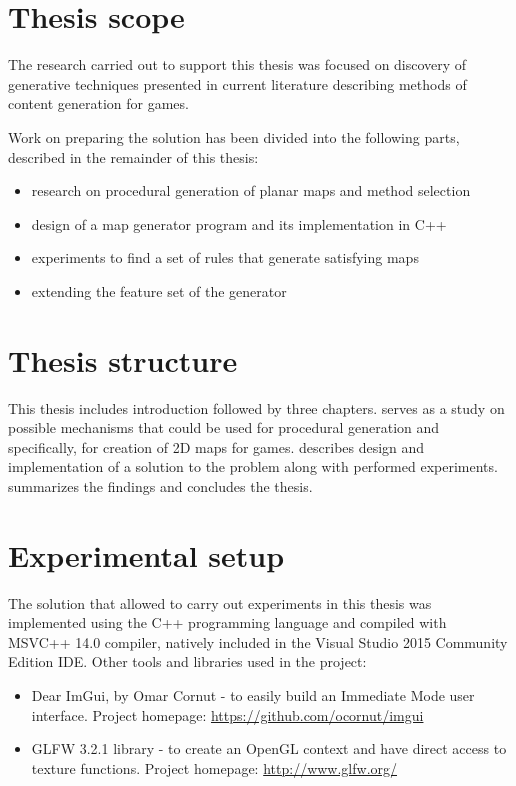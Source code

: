 \documentclass[12pt]{report}
\begin{document}
\section{Thesis scope}

The research carried out to support this thesis was focused on discovery of generative techniques presented in current literature describing methods of content generation for games. 

Work on preparing the solution has been divided into the following parts, described in the remainder of this thesis:

\begin{itemize}
	\item research on procedural generation of planar maps and method selection
	\item design of a map generator program and its implementation in C++
	\item experiments to find a set of rules that generate satisfying maps
	\item extending the feature set of the generator
\end{itemize} 

\section{Thesis structure}
This thesis includes introduction followed by three chapters.  serves as a study on possible mechanisms that could be used for procedural generation and specifically, for creation of 2D maps for games.  describes design and implementation of a solution to the problem along with performed experiments.  summarizes the findings and concludes the thesis.

\section{Experimental setup}

The solution that allowed to carry out experiments in this thesis was implemented using the C++ programming language and compiled with MSVC++ 14.0 compiler, natively included in the Visual Studio 2015 Community Edition IDE. Other tools and libraries used in the project:

\begin{itemize}
	\item Dear ImGui, by Omar Cornut - to easily build an Immediate Mode user interface. Project homepage:  \url{https://github.com/ocornut/imgui}
	\item GLFW 3.2.1 library - to create an OpenGL context and have direct access to texture functions. Project homepage: \url{http://www.glfw.org/}  
\end{itemize}  
\end{document}
